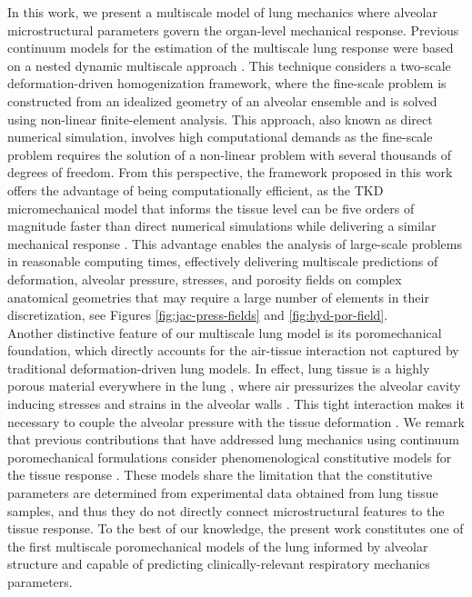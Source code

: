 \documentclass[preprint,3p,12pt,number,sort&compress]{elsarticle}
\begin{document}
In this work, we present a multiscale model of lung mechanics where alveolar microstructural parameters govern the organ-level mechanical response. Previous continuum models for the estimation of the multiscale lung response were based on a nested dynamic multiscale approach \cite{wiechert2010nested,WallEtal2010}. This technique considers a two-scale deformation-driven homogenization framework, where the fine-scale problem is constructed from an idealized geometry of an alveolar ensemble and is solved using non-linear finite-element analysis. This approach, also known as direct numerical simulation, involves high computational demands as the fine-scale problem requires the solution of a non-linear problem with several thousands of degrees of freedom. From this perspective, the framework proposed in this work offers the advantage of being computationally efficient, as the TKD micromechanical model that informs the tissue level can be five orders of magnitude faster than direct numerical simulations while delivering a similar mechanical response \cite{concha2020upscaling}. This advantage enables the analysis of large-scale problems in reasonable computing times, effectively delivering multiscale predictions of deformation, alveolar pressure, stresses, and porosity fields on complex anatomical geometries that may require a large number of elements in their discretization, see Figures \ref{fig:jac-press-fields} and \ref{fig:hyd-por-field}.\\

Another distinctive feature of our multiscale lung model is its poromechanical foundation, which directly accounts for the air-tissue interaction not captured by traditional deformation-driven lung models. In effect, lung tissue is a highly porous material everywhere in the lung \cite{SarabiaEtal2021}, where air pressurizes the alveolar cavity inducing stresses and strains in the alveolar walls \cite{AlvarezEtal2021}. This tight interaction makes it necessary to couple the alveolar pressure with the tissue deformation \cite{SarabiaEtal2019}. We remark that previous contributions that have addressed lung mechanics using continuum poromechanical formulations consider phenomenological constitutive models for the tissue response \cite{berger2016poroelastic,PatteEtal2022,kowalczyk1993mechanical,avileshurtado2022whole}. These models share the limitation that the constitutive parameters are determined from experimental data obtained from lung tissue samples, and thus they do not directly connect microstructural features to the tissue response. To the best of our knowledge, the present work constitutes one of the first multiscale poromechanical models of the lung informed by alveolar structure and capable of predicting clinically-relevant respiratory mechanics parameters.\\ 
\end{document}
